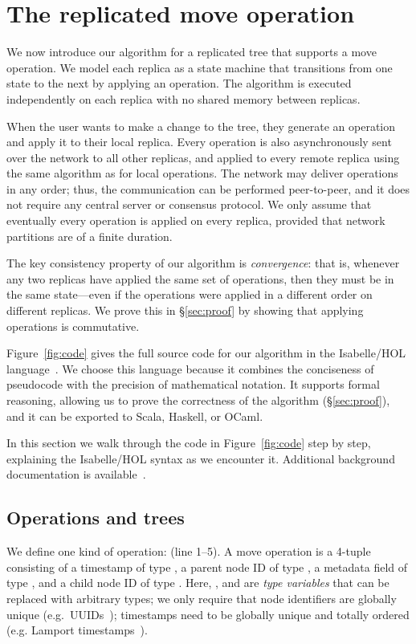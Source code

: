 \documentclass[sigplan,anonymous]{acmart}
\begin{document}
\section{The replicated move operation}\label{sec:algorithm}

We now introduce our algorithm for a replicated tree that supports a move operation.
We model each replica as a state machine that transitions from one state to the next by applying an operation.
The algorithm is executed independently on each replica with no shared memory between replicas.

When the user wants to make a change to the tree, they generate an operation and apply it to their local replica.
Every operation is also asynchronously sent over the network to all other replicas, and applied to every remote replica using the same algorithm as for local operations.
The network may deliver operations in any order; thus, the communication can be performed peer-to-peer, and it does not require any central server or consensus protocol.
We only assume that eventually every operation is applied on every replica, provided that network partitions are of a finite duration.

The key consistency property of our algorithm is \emph{convergence}: that is, whenever any two replicas have applied the same set of operations, then they must be in the same state---even if the operations were applied in a different order on different replicas.
We prove this in \S\ref{sec:proof} by showing that applying operations is commutative.

Figure~\ref{fig:code} gives the full source code for our algorithm in the Isabelle/HOL language~\cite{DBLP:conf/tphol/WenzelPN08}.
We choose this language because it combines the conciseness of pseudocode with the precision of mathematical notation.
It supports formal reasoning, allowing us to prove the correctness of the algorithm (\S\ref{sec:proof}), and it can be exported to Scala, Haskell, or OCaml.

In this section we walk through the code in Figure~\ref{fig:code} step by step, explaining the Isabelle/HOL syntax as we encounter it.
Additional background documentation is available~\cite{DBLP:books/sp/NipkowK14}.

\subsection{Operations and trees}\label{sec:ops-trees}

We define one kind of operation:  (line 1--5).
A move operation is a 4-tuple consisting of a timestamp  of type , a parent node ID  of type , a metadata field  of type , and a child node ID  of type .
Here, ,  and  are \emph{type variables} that can be replaced with arbitrary types; we only require that node identifiers  are globally unique (e.g.\ UUIDs~\cite{Leach:2005hm}); timestamps  need to be globally unique and totally ordered (e.g. Lamport timestamps~\cite{Lamport:1978jq}).
\end{document}
